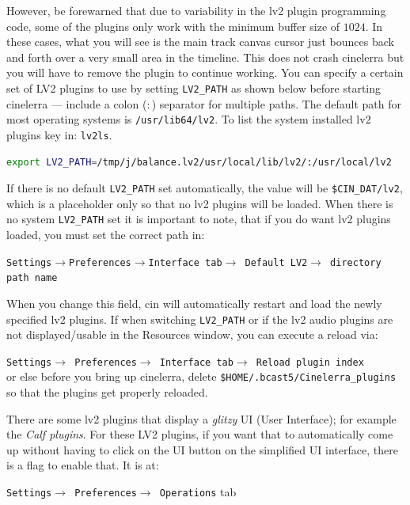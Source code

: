 However, be forewarned that due to variability in the lv2 plugin programming code, some of the plugins only work with the minimum buffer size of $1024$. In these cases, what you will see is the main track canvas cursor just bounces back and forth over a very small area in the timeline. This does not crash cinelerra but you will have to remove the plugin to continue working.
You can specify a certain set of LV2 plugins to use by setting \texttt{LV2\_PATH} as shown below before starting cinelerra --- include a colon ($:$) separator for multiple paths. The default path for most operating systems is \texttt{/usr/lib64/lv2}. To list the system installed lv2 plugins key in: \texttt{lv2ls}.

\begin{lstlisting}[language=Bash]
export LV2_PATH=/tmp/j/balance.lv2/usr/local/lib/lv2/:/usr/local/lv2
\end{lstlisting}

If there is no default \texttt{LV2\_PATH} set automatically, the value will be \texttt{\$CIN\_DAT/lv2}, which is a placeholder only so that no lv2 plugins will be loaded. When there is no system \texttt{LV2\_PATH} set it is important to note, that if you do want lv2 plugins loaded, you must set the correct path in:

\texttt{Settings$\rightarrow$Preferences$\rightarrow$Interface tab$\rightarrow$ Default LV2$\rightarrow$ directory \\
    path name}

When you change this field, cin will automatically restart and load the newly specified lv2 plugins. If when switching \texttt{LV2\_PATH} or if the lv2 audio plugins are not displayed/usable in the Resources window, you can execute a reload via:

\texttt{Settings$\rightarrow$  Preferences$\rightarrow$ Interface tab$\rightarrow$ Reload plugin index} \\
or else before you bring up cinelerra, delete \texttt{\$HOME/.bcast5/Cinelerra\_plugins} so that the plugins get properly reloaded.

There are some lv2 plugins that display a \textit{glitzy} UI (User Interface); for example the \textit{Calf plugins}. For these LV2 plugins, if you want that to automatically come up without having to click on the UI button on the simplified UI interface, there is a flag to enable that. It is at:

\texttt{Settings$\rightarrow$ Preferences$\rightarrow$ Operations} tab

